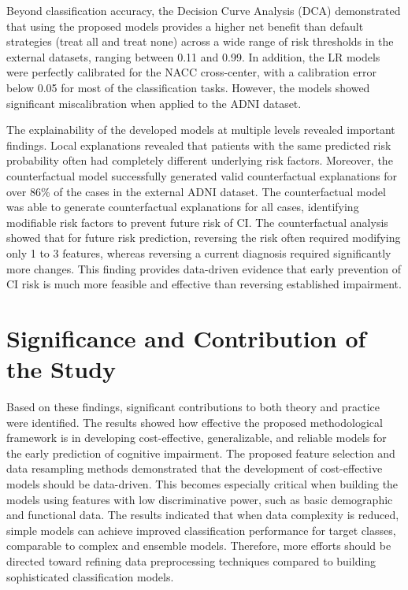 Beyond classification accuracy, the Decision Curve Analysis (\acrshort{DCA}) demonstrated that using the proposed models provides a higher net benefit than default strategies (treat all and treat none) across a wide range of risk thresholds in the external datasets, ranging between 0.11 and 0.99. In addition, the LR models were perfectly calibrated for the NACC cross-center, with a calibration error below 0.05 for most of the classification tasks. However, the models showed significant miscalibration when applied to the ADNI dataset.

The explainability of the developed models at multiple levels revealed important findings. Local explanations revealed that patients with the same predicted risk probability often had completely different underlying risk factors. Moreover, the counterfactual model successfully generated valid counterfactual explanations for over 86\% of the cases in the external ADNI dataset. The counterfactual model was able to generate counterfactual explanations for all cases, identifying modifiable risk factors to prevent future risk of CI. The counterfactual analysis showed that for future risk prediction, reversing the risk often required modifying only 1 to 3 features, whereas reversing a current diagnosis required significantly more changes. This finding provides data-driven evidence that early prevention of CI risk is much more feasible and effective than reversing established impairment.

\section{Significance and Contribution of the Study}
Based on these findings, significant contributions to both theory and practice were identified. The results showed how effective the proposed methodological framework is in developing cost-effective, generalizable, and reliable models for the early prediction of cognitive impairment. The proposed feature selection and data resampling methods demonstrated that the development of cost-effective models should be data-driven. This becomes especially critical when building the models using features with low discriminative power, such as basic demographic and functional data. The results indicated that when data complexity is reduced, simple models can achieve improved classification performance for target classes, comparable to complex and ensemble models. Therefore, more efforts should be directed toward refining data preprocessing techniques compared to building sophisticated classification models.

